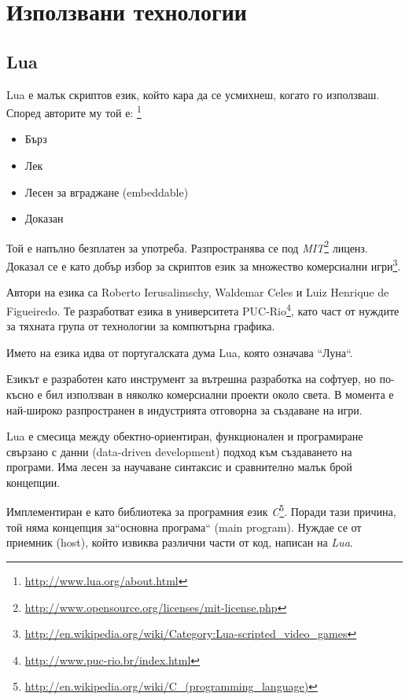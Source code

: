 \chapter{Използвани технологии}

	\section{Lua}
	
		Lua е малък скриптов език, който кара да се усмихнеш, когато го използваш. 
		Според авторите му той е: \footnote{\url{http://www.lua.org/about.html}} 
		
		\begin{itemize}			
			\item Бърз				
			\item Лек				
			\item Лесен за вграджане (embeddable)				
			\item Доказан				
		\end{itemize}
		
		Той е напълно безплатен за употреба. Разпространява се под 
		\emph{MIT}\footnote{\url{http://www.opensource.org/licenses/mit-license.php}} лиценз. 
		Доказал се е като добър избор за скриптов език за множество комерсиални 
		игри\footnote{\url{http://en.wikipedia.org/wiki/Category:Lua-scripted_video_games}}.
		
		Автори на езика са Roberto Ierusalimschy, Waldemar Celes и Luiz Henrique de Figueiredo. Те разработват езика в
		университета PUC-Rio\footnote{\url{http://www.puc-rio.br/index.html}}, като част от нуждите за тяхната група
		от технологии за компютърна графика. 
		
		Името на езика идва от португалската дума Lua, която означава ``Луна``.
		
		Езикът е разработен като инструмент за вътрешна разработка на софтуер, но по-късно е бил
		използван в няколко комерсиални проекти около света. В момента е най-широко разпространен в
		индустрията отговорна за създаване на игри. \cite{Ierusalimschy}
		
		Lua е смесица между обектно-ориентиран, функционален и програмиране свързано с данни (data-driven development)
		подход към създаването на програми. Има лесен за научаване синтаксис и сравнително малък брой концепции. 				
		
		Имплементиран е като библиотека за програмния език \emph{C}\footnote{\url{http://en.wikipedia.org/wiki/C_(programming_language)}}. 
		Поради тази причина, той няма концепция за``основна програма`` (main program). Нуждае се от приемник (host), който извиква различни
		части от код, написан на \emph{Lua}.
		
